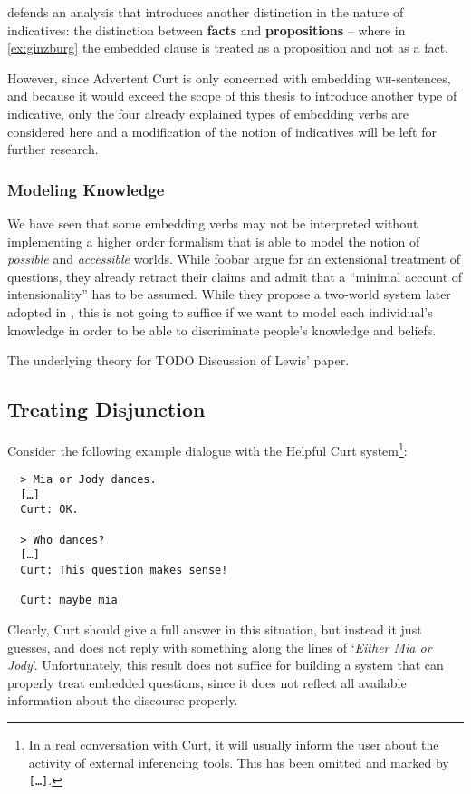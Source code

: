\documentclass[a4paper]{article}
\newcommand{\term}[1]{\textsf{\textbf{#1}}} %
\newcommand{\code}[1]{\texttt{#1}} %
\newcommand{\pn}{\textsf} %
\newcommand{\example}[1]{`\textit{#1}'} %
\newcommand{\wh}{\textsc{wh}}
\newcommand{\curt}{\pn{Curt}}
\newcommand{\acurt}{\pn{Advertent Curt}}
\theoremstyle{remark}
\theoremstyle{remark}
\theoremstyle{definition}
\theoremstyle{definition}
\begin{document}
\cite{ginzburg} defends an analysis that
introduces another distinction in the nature of indicatives: the distinction
between \term{facts} and \term{propositions} -- where in \ref{ex:ginzburg} the
embedded clause is treated as a proposition and not as a fact.

However, since \acurt{} is only concerned with embedding \wh-sentences, and
because it would exceed the scope of this thesis to introduce another type of
indicative, only the four already explained types of embedding verbs are 
considered here and a modification of the notion of indicatives will be left for
further research.

\subsubsection{Modeling Knowledge}\label{sec:epistemic}

We have seen that some embedding verbs may not be interpreted without
implementing a higher order formalism that is able to model the notion of
\emph{possible} and \emph{accessible} worlds. While foobar %
argue for an extensional treatment of questions, they already %
retract their claims and admit that a ``minimal account of intensionality'' has
to be assumed. While they propose a two-world system later adopted in
\cite{g:is}, this is not going to suffice if we want to model each individual's
knowledge in order to be able to discriminate people's knowledge and beliefs.

The underlying theory for 
TODO Discussion of Lewis' paper.

\subsection{Treating Disjunction}

Consider the following example dialogue with the \pn{Helpful Curt}
system\footnote{In a real conversation with \curt, it will usually inform the
user about the activity of external inferencing tools. This has been omitted and
marked by \code{[…]}.}:

\begin{verbatim}
  > Mia or Jody dances.
  […]
  Curt: OK.

  > Who dances?
  […]
  Curt: This question makes sense!

  Curt: maybe mia
\end{verbatim}

Clearly, \curt{} should give a full answer in this situation, but instead it
just guesses, and does not reply with something along the lines of \example{Either
Mia or Jody}. Unfortunately, this result does not suffice for building a system
that can properly treat embedded questions, since it does not reflect all
available information about the discourse properly.
\end{document}
